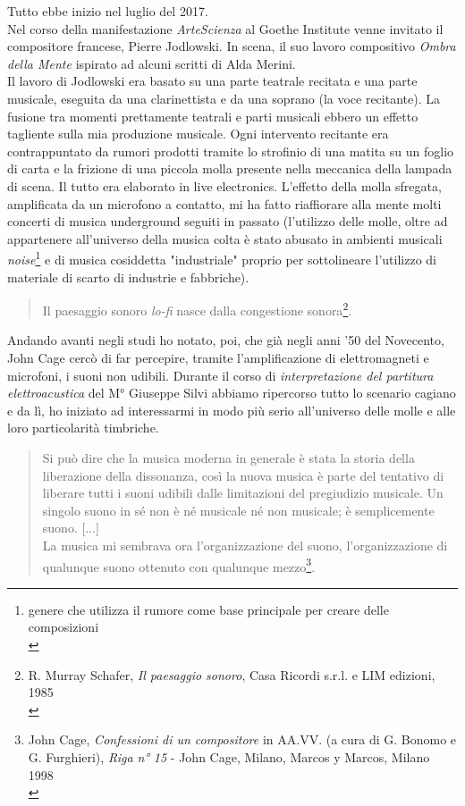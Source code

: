 Tutto ebbe inizio nel luglio del 2017. \\
Nel corso della manifestazione \textit{ArteScienza} al Goethe Institute venne invitato il compositore francese, Pierre Jodlowski. In scena, il suo lavoro compositivo \textit{Ombra della Mente} ispirato ad alcuni scritti di Alda Merini. \\
Il lavoro di Jodlowski era basato su una parte teatrale recitata e una parte musicale, eseguita da una clarinettista e da una soprano (la voce recitante). La fusione tra momenti prettamente teatrali e parti musicali ebbero un effetto tagliente sulla mia produzione musicale. Ogni intervento recitante era contrappuntato da rumori prodotti tramite lo strofinio di una matita su un foglio di carta e la frizione di una piccola molla presente nella meccanica della lampada di scena. Il tutto era elaborato in live electronics. L'effetto della molla sfregata, amplificata da un microfono a contatto, mi ha fatto riaffiorare alla mente molti concerti di musica underground seguiti in passato (l'utilizzo delle molle, oltre ad appartenere all'universo della musica colta è stato abusato in ambienti musicali \textit{noise}\footnote{genere che utilizza il rumore come base principale per creare delle composizioni \\} e di musica cosiddetta "industriale" proprio per sottolineare l'utilizzo di materiale di scarto di industrie e fabbriche).
\begin{quotation}
Il paesaggio sonoro \textit{lo-fi} nasce dalla congestione sonora\footnote{R. Murray Schafer, \textit{Il paesaggio sonoro}, Casa Ricordi s.r.l. e LIM edizioni, 1985 \\}.
\end{quotation}
Andando avanti negli studi ho notato, poi, che già negli anni '50 del Novecento, John Cage cercò di far percepire, tramite l'amplificazione di elettromagneti e microfoni, i suoni non udibili. Durante il corso di \textit{interpretazione del partitura elettroacustica} del M° Giuseppe Silvi abbiamo ripercorso tutto lo scenario cagiano e da lì, ho iniziato ad interessarmi in modo più serio all'universo delle molle e alle loro particolarità timbriche.
\begin{small}
\begin{quotation}
Si può dire che la musica moderna in generale è stata la storia della liberazione della dissonanza, così la nuova musica è parte del tentativo di liberare tutti i suoni udibili dalle limitazioni del pregiudizio musicale.
Un singolo suono in sé non è né musicale né non musicale; è semplicemente suono. [...] \\
La musica mi sembrava ora l'organizzazione del suono, l'organizzazione di qualunque suono ottenuto con qualunque mezzo\footnote{John Cage, \textit{Confessioni di un compositore} in AA.VV. (a cura di G. Bonomo e G. Furghieri), \textit{Riga n° 15} - John Cage, Milano, Marcos y Marcos, Milano 1998 \\}.
\end{quotation}
\end{small}
